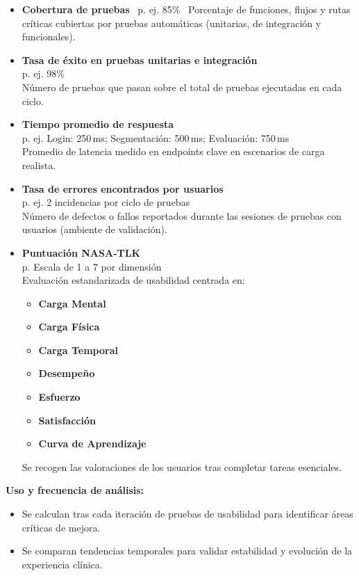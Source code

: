 \begin{itemize}
\item \textbf{Cobertura de pruebas}  \
p. ej. 85\%  \
Porcentaje de funciones, flujos y rutas críticas cubiertas por pruebas automáticas (unitarias, de integración y funcionales).
\item \textbf{Tasa de éxito en pruebas unitarias e integración}  \\
p. ej. 98\%  \\
Número de pruebas que pasan sobre el total de pruebas ejecutadas en cada ciclo.

\item \textbf{Tiempo promedio de respuesta}  \\
p. ej. Login: 250\,ms; Segmentación: 500\,ms; Evaluación: 750\,ms  \\
Promedio de latencia medido en endpoints clave en escenarios de carga realista.

\item \textbf{Tasa de errores encontrados por usuarios}  \\
p. ej. 2 incidencias por ciclo de pruebas  \\
Número de defectos o fallos reportados durante las sesiones de pruebas con usuarios (ambiente de validación).

\item \textbf{Puntuación NASA-TLK}  \\
p. Escala de 1 a 7 por dimensión  \\
Evaluación estandarizada de usabilidad centrada en:  \\
   \begin{itemize}
       \item \textbf{Carga Mental}
       \item \textbf{Carga Física}
       \item \textbf{Carga Temporal}
       \item \textbf{Desempeño}
       \item \textbf{Esfuerzo}
       \item \textbf{Satisfacción}
       \item \textbf{Curva de Aprendizaje}
   \end{itemize}
Se recogen las valoraciones de los usuarios tras completar tareas esenciales.
\end{itemize}

\noindent\textbf{Uso y frecuencia de análisis:}
\begin{itemize}
\item Se calculan tras cada iteración de pruebas de usabilidad para identificar áreas críticas de mejora.
\item Se comparan tendencias temporales para validar estabilidad y evolución de la experiencia clínica.

\end{itemize}
